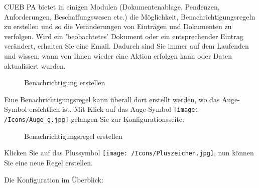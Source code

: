 CUEB PA bietet in einigen Modulen (Dokumentenablage, Pendenzen, Anforderungen, Beschaffungswesen etc.) die Möglichkeit, Benachrichtigungsregeln zu erstellen und so die Veränderungen von Einträgen und Dokumenten zu verfolgen. Wird ein 'beobachtetes' Dokument oder ein entsprechender Eintrag verändert, erhalten Sie eine Email. Dadurch sind Sie immer auf dem Laufenden und wissen, wann von Ihnen wieder eine Aktion erfolgen kann oder Daten aktualisiert wurden.

\begin{figure}[H]
\caption{Benachrichtigung erstellen}
\end{figure}

Eine Benachrichtigungsregel kann überall dort erstellt werden, wo das Auge-Symbol ersichtlich ist. Mit Klick auf das Auge-Symbol \texttt{[image: /Icons/Auge\_g.jpg]}  gelangen Sie zur Konfigurationsseite:

\begin{figure}[H]
\caption{Benachrichtigungsregel erstellen}
\end{figure}

Klicken Sie auf das Plussymbol \texttt{[image: /Icons/Pluszeichen.jpg]}, nun können Sie eine neue Regel erstellen.

Die Konfiguration im Überblick:

